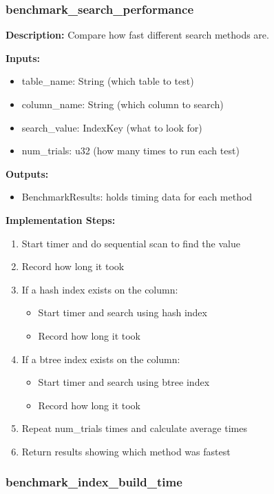 \documentclass[11pt,a4paper]{article}
\begin{document}
\subsubsection{benchmark\_search\_performance}

\textbf{Description:} Compare how fast different search methods are.

\textbf{Inputs:}
\begin{itemize}
\item table\_name: String (which table to test)
\item column\_name: String (which column to search)
\item search\_value: IndexKey (what to look for)
\item num\_trials: u32 (how many times to run each test)
\end{itemize}

\textbf{Outputs:}
\begin{itemize}
\item BenchmarkResults: holds timing data for each method
\end{itemize}

\textbf{Implementation Steps:}
\begin{enumerate}
\item Start timer and do sequential scan to find the value
\item Record how long it took
\item If a hash index exists on the column:
    \begin{itemize}
    \item Start timer and search using hash index
    \item Record how long it took
    \end{itemize}
\item If a btree index exists on the column:
    \begin{itemize}
    \item Start timer and search using btree index
    \item Record how long it took
    \end{itemize}
\item Repeat num\_trials times and calculate average times
\item Return results showing which method was fastest
\end{enumerate}

\subsubsection{benchmark\_index\_build\_time}
\end{document}
